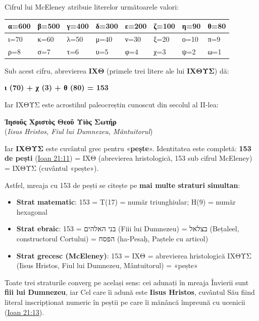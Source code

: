 \documentclass[12pt,a4paper,twoside,openany]{book}
\begin{document}
Cifrul lui McEleney atribuie literelor următoarele valori:

\begin{center}
\small
\begin{tabular}{|l|l|l|l|l|l|l|l|}
\hline
\rowcolor{primarylight}
α=600 & β=500 & γ=400 & δ=300 & ε=200 & ζ=100 & η=90 & θ=80 \\
\hline
ι=70 & κ=60 & λ=50 & μ=40 & ν=30 & ξ=20 & ο=10 & π=9 \\
\hline
ρ=8 & σ=7 & τ=6 & υ=5 & φ=4 & χ=3 & ψ=2 & ω=1 \\
\hline
\end{tabular}
\end{center}

Sub acest cifru, abrevierea \textbf{ΙΧΘ} (primele trei litere ale lui \textbf{ΙΧΘΥΣ}) dă:

\begin{center}
\large
\textbf{ι (70) + χ (3) + θ (80) = 153}
\end{center}

Iar ΙΧΘΥΣ este acrostihul paleocreștin cunoscut din secolul al II-lea:

\begin{center}
\textbf{Ἰησοῦς Χριστὸς Θεοῦ Υἱὸς Σωτήρ}\\
(\textit{Iisus Hristos, Fiul lui Dumnezeu, Mântuitorul})
\end{center}

Iar \textbf{ΙΧΘΥΣ} este cuvântul grec pentru «\textbf{pește}». Identitatea este completă: \textbf{153 de pești} (\href{https://bibliaortodoxa.ro/carte.php?id=35\&cap=21\#11}{Ioan 21:11}) = ΙΧΘ (abrevierea hristologică, 153 sub cifrul McEleney) = ΙΧΘΥΣ (cuvântul «pește»).

Astfel, mreaja cu 153 de pești se citește pe \textbf{mai multe straturi simultan}:

\begin{itemize}
  \item \textbf{Strat matematic}: 153 = T(17) = număr triunghiular; H(9) = număr hexagonal
  \item \textbf{Strat ebraic}: 153 = בני האלהים (Fiii lui Dumnezeu) = בצלאל (Bețaleel, constructorul Cortului) = הפסח (ha-Pesaḥ, Paștele cu articol)
  \item \textbf{Strat grecesc (McEleney)}: 153 = ΙΧΘ = abrevierea hristologică ΙΧΘΥΣ (Iisus Hristos, Fiul lui Dumnezeu, Mântuitorul) = «pește»
\end{itemize}

Toate trei straturile converg pe același sens: cei adunați în mreaja Învierii sunt \textbf{fiii lui Dumnezeu}, iar Cel care îi adună este \textbf{Iisus Hristos}, cuvântul Său fiind literal inscripționat numeric în peștii pe care îi mănâncă împreună cu ucenicii (\href{https://bibliaortodoxa.ro/carte.php?id=35\&cap=21\#13}{Ioan 21:13}).
\end{document}
